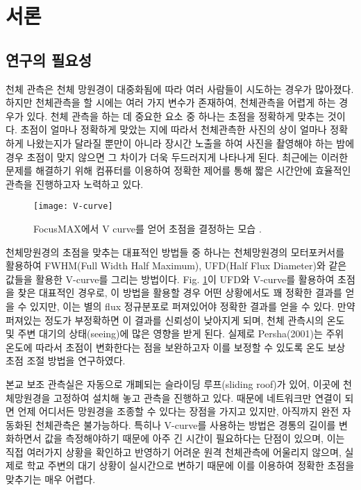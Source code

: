 

\section{서론}
\subsection{연구의 필요성}

천체 관측은 천체 망원경이 대중화됨에 따라 여러 사람들이 시도하는 경우가 많아졌다. 하지만 천체관측을 할 시에는 여러 가지 변수가 존재하여, 천체관측을 어렵게 하는 경우가 있다. 천체 관측을 하는 데 중요한 요소 중 하나는 초점을 정확하게 맞추는 것이다. 초점이 얼마나 정확하게 맞았는 지에 따라서 천체관측한 사진의 상이 얼마나 정확하게 나왔는지가 달라질 뿐만이 아니라 장시간 노출을 하여 사진을 촬영해야 하는 밤에 경우 초점이 맞지 않으면 그 차이가 더욱 두드러지게 나타나게 된다. 최근에는 이러한 문제를 해결하기 위해 컴퓨터를 이용하여 정확한 제어를 통해 짧은 시간안에 효율적인 관측을 진행하고자 노력하고 있다.

\begin{figure}[h]
	\begin{center}
		\texttt{[image: V-curve]}
	\end{center}
	\caption{FocusMAX에서 V curve를 얻어 초점을 결정하는 모습 \cite{weber2001fast}.}
	\label{V-curve}
\end{figure}

천체망원경의 초점을 맞추는 대표적인 방법들 중 하나는 천체망원경의 모터포커서를 활용하여 FWHM(Full Width Half Maximum), UFD(Half Flux Diameter)와 같은 값들을 활용한 V-curve를 그리는 방법이다. Fig. \ref{V-curve}이 UFD와 V-curve를 활용하여 초점을 찾은 대표적인 경우로, 이 방법을 활용할 경우 어떤 상황에서도 꽤 정확한 결과를 얻을 수 있지만, 이는 별의 flux 정규분포로 퍼져있어야 정확한 결과를 얻을 수 있다. 만약 퍼져있는 정도가 부정확하면 이 결과를 신뢰성이 낮아지게 되며, 천체 관측시의 온도 및 주변 대기의 상태(seeing)에 많은 영향을 받게 된다. 실제로 Persha(2001)는 주위 온도에 따라서 초점이 변화한다는 점을 보완하고자 이를 보정할 수 있도록 온도 보상 초점 조절 방법을 연구하였다.\cite{persha2001temperature}


본교 보조 관측실은 자동으로 개폐되는 슬라이딩 루프(sliding roof)가 있어, 이곳에 천체망원경을 고정하여 설치해 놓고 관측을 진행하고 있다. 때문에 네트워크만 연결이 되면 언제 어디서든 망원경을 조종할 수 있다는 장점을 가지고 있지만, 아직까지 완전 자동화된 천체관측은 불가능하다. 특히나 V-curve를 사용하는 방법은 경통의 길이를 변화하면서 값을 측정해야하기 때문에 아주 긴 시간이 필요하다는 단점이 있으며, 이는 직접 여러가지 상황을 확인하고 반영하기 어려운 원격 천체관측에 어울리지 않으며, 실제로 학교 주변의 대기 상황이 실시간으로 변하기 때문에 이를 이용하여 정확한 초점을 맞추기는 매우 어렵다.


